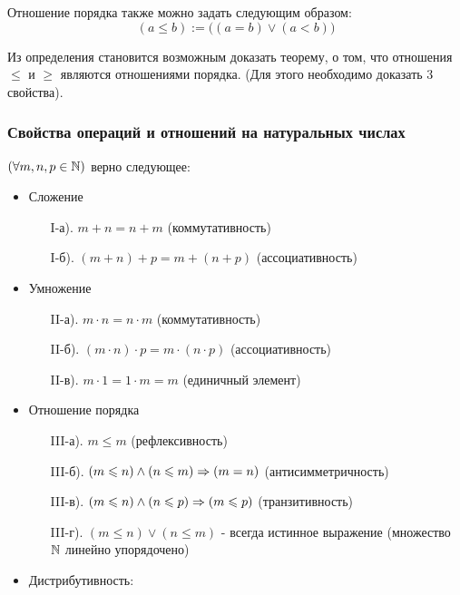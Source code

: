 \begin{anote}
    Отношение порядка также можно задать следующим образом:
    \[
    	(a \le b) := \big((a = b) \vee (a < b)\big)
    \]
\end{anote}

Из определения становится возможным доказать теорему,
о том, что отношения $\le$ и $\ge$ являются отношениями порядка.
(Для этого необходимо доказать 3 свойства).

\subsubsection*{Свойства операций и отношений на натуральных числах}

\begin{theorem}
    $(\forall m, n, p \in \mathbb{N})$ верно следующее:

    \begin{itemize}
        \item Сложение
        \begin{itemize}
            \item[I-а).] $m + n = n + m$ (коммутативность)
            \item[I-б).] $(m + n) + p = m + (n + p)$ (ассоциативность)
        \end{itemize}
        \item Умножение
        \begin{itemize}
            \item[II-а).] $m \cdot n = n \cdot m$ (коммутативность)
            \item[II-б).] $(m \cdot n) \cdot p = m \cdot (n \cdot p)$ (ассоциативность)
            \item[II-в).] $m \cdot 1 = 1 \cdot m = m$ (единичный элемент)
        \end{itemize}
        \item Отношение порядка
        \begin{itemize}
            \item[III-а).] $m \le m$ (рефлексивность)
            \item[III-б).] $(m \leqslant n) \wedge (n \leqslant m) \Rightarrow (m = n)$ (антисимметричность)
            \item[III-в).] $(m \leqslant n) \wedge (n \leqslant p) \Rightarrow (m \leqslant p)$ (транзитивность)
            \item[III-г).] $(m \le n) \vee (n \le m)$ - всегда истинное
                выражение (множество $\mathbb{N}$ линейно упорядочено)
        \end{itemize}
        \item Дистрибутивность:


\end{itemize}
\end{theorem}
